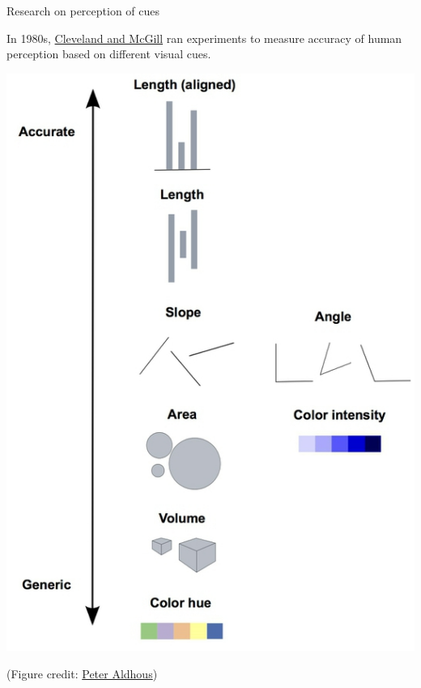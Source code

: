 \documentclass[table]{beamer}\usepackage[]{graphicx}\usepackage[]{xcolor}
\begin{document}


\begin{frame}[fragile]{Research on perception of cues}

\begin{block}{In 1980s, \href{https://courses.ischool.berkeley.edu/i247/f05/readings/Cleveland_GraphicalPerception_Science85.pdf}{Cleveland and McGill} ran experiments to measure accuracy of human perception based on different visual cues.}

\includegraphics[width=.45\textwidth]{figure-static/perception.jpeg}

\tiny (Figure credit: \href{https://paldhous.github.io/ucb/2016/dataviz/week2.html}{Peter Aldhous})
\end{block}

\vspace{15em}

\end{frame}

%
%
\end{document}
